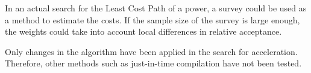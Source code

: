 \documentclass[acmtog]{acmart}
\begin{document}
	In an actual search for the Least Cost Path of a power, a survey could be used as a method to estimate the costs.
	If the sample size of the survey is large enough, the
	weights could take into account local differences in relative acceptance.
	
	Only changes in the algorithm have been applied in the search for acceleration.
	Therefore, other methods such as just-in-time compilation have not been tested.












\end{document}
